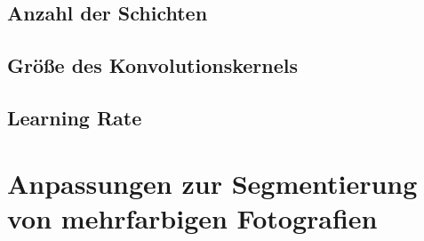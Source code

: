\subsection{Anzahl der Schichten}

\subsection{Größe des Konvolutionskernels}

\subsection{Learning Rate}

\fi
\section{Anpassungen zur Segmentierung von mehrfarbigen Fotografien}
\label{sec:color_picture_optimization}